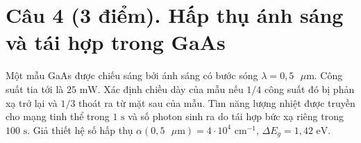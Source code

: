 \documentclass[11pt,a4paper]{article}
\begin{document}
\section*{Câu 4 (3 điểm). Hấp thụ ánh sáng và tái hợp trong GaAs}

Một mẫu GaAs được chiếu sáng bởi ánh sáng có bước sóng $\lambda = 0{,}5\text{ }\mu\text{m}$. Công suất tia tới là $25\text{ mW}$. Xác định chiều dày của mẫu nếu $1/4$ công suất đó bị phản xạ trở lại và $1/3$ thoát ra từ mặt sau của mẫu. Tìm năng lượng nhiệt được truyền cho mạng tinh thể trong $1\text{ s}$ và số photon sinh ra do tái hợp bức xạ riêng trong $100\text{ s}$. Giả thiết hệ số hấp thụ $\alpha(0{,}5\text{ }\mu\text{m}) = 4 \cdot 10^4\text{ cm}^{-1}$, $\Delta E_g = 1{,}42\text{ eV}$.
\end{document}
